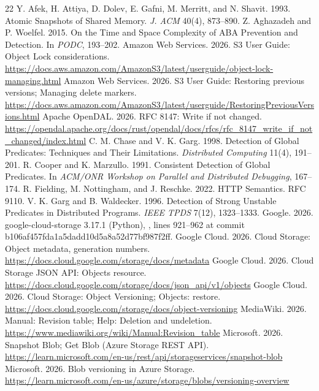 \begin{thebibliography}{22}
 Y. Afek, H. Attiya, D. Dolev, E. Gafni, M. Merritt, and N. Shavit.
1993. Atomic Snapshots of Shared Memory. \emph{J. ACM} 40(4), 873--890.
 Z. Aghazadeh and P. Woelfel. 2015.
On the Time and Space Complexity of ABA Prevention and Detection. In \emph{PODC}, 193--202.
 Amazon Web Services. 2026. S3 User Guide: Object Lock considerations.
\url{https://docs.aws.amazon.com/AmazonS3/latest/userguide/object-lock-managing.html}
 Amazon Web Services. 2026. S3 User Guide: Restoring previous
versions; Managing delete markers.
\url{https://docs.aws.amazon.com/AmazonS3/latest/userguide/RestoringPreviousVersions.html}
 Apache OpenDAL. 2026. RFC 8147: Write if not changed.
\url{https://opendal.apache.org/docs/rust/opendal/docs/rfcs/rfc_8147_write_if_not_changed/index.html}
 C. M. Chase and V. K. Garg. 1998. Detection of Global
Predicates: Techniques and Their Limitations. \emph{Distributed Computing}
11(4), 191--201.
 R. Cooper and K. Marzullo. 1991. Consistent Detection of
Global Predicates. In \emph{ACM/ONR Workshop on Parallel and Distributed
Debugging}, 167--174.
 R. Fielding, M. Nottingham, and J. Reschke. 2022.
HTTP Semantics. RFC 9110.
 V. K. Garg and B. Waldecker. 1996. Detection of Strong
Unstable Predicates in Distributed Programs. \emph{IEEE TPDS} 7(12), 1323--1333.
 Google. 2026. google-cloud-storage 3.17.1 (Python), ,
lines 921--962 at commit b106af457fda1a5dadd10d5a8a52d77bf987f2ff.
 Google Cloud. 2026. Cloud Storage: Object metadata, generation numbers.
\url{https://docs.cloud.google.com/storage/docs/metadata}
 Google Cloud. 2026. Cloud Storage JSON API: Objects resource.
\url{https://docs.cloud.google.com/storage/docs/json_api/v1/objects}
 Google Cloud. 2026. Cloud Storage: Object Versioning; Objects: restore.
\url{https://docs.cloud.google.com/storage/docs/object-versioning}
 MediaWiki. 2026. Manual: Revision table; Help: Deletion and undeletion.
\url{https://www.mediawiki.org/wiki/Manual:Revision_table}
 Microsoft. 2026. Snapshot Blob; Get Blob (Azure Storage REST API).
\url{https://learn.microsoft.com/en-us/rest/api/storageservices/snapshot-blob}
 Microsoft. 2026. Blob versioning in Azure Storage.
\url{https://learn.microsoft.com/en-us/azure/storage/blobs/versioning-overview}

\end{thebibliography}
